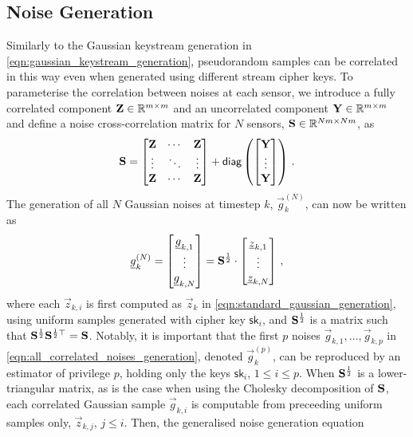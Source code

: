 \documentclass[conference]{IEEEtran}
\begin{document}
\subsection{Noise Generation}\label{subsec:noise_gen}
Similarly to the Gaussian keystream generation in \eqref{eqn:gaussian_keystream_generation}, pseudorandom samples can be correlated in this way even when generated using different stream cipher keys. To parameterise the correlation between noises at each sensor, we introduce a fully correlated component ${{\mathbf{Z}}}\in\mathbb{R}^{m\times m}$ and an uncorrelated component ${{\mathbf{Y}}}\in\mathbb{R}^{m\times m}$ and define a noise cross-correlation matrix for $N$ sensors, ${{\mathbf{S}}} \in \mathbb{R}^{Nm\times Nm}$, as
\begin{equation}\label{eqn:noise_correlation_matrix}
  \mat{S}=
  \begin{bmatrix}
    \mat{Z} & \cdots & \mat{Z}\\
    \vdots & \ddots & \vdots\\
    \mat{Z} & \cdots & \mat{Z}\\
  \end{bmatrix}+\mathsf{diag}\left(
  \begin{bmatrix}
    \mat{Y}\\
    \vdots\\
    \mat{Y}\\
  \end{bmatrix}\right)\,.
\end{equation}
The generation of all $N$ Gaussian noises at timestep $k$, $\vec{g}_k^{(N)}$, can now be written as
\begin{equation}\label{eqn:all_correlated_noises_generation}
  \vec{g}_k^{(N)}=
  \begin{bmatrix}
    \vec{g}_{k,1}\\
    \vdots\\
    \vec{g}_{k,N}
  \end{bmatrix}=
  \mat{S}^\frac{1}{2}\cdot
  \begin{bmatrix}
    \vec{z}_{k,1}\\
    \vdots\\
    \vec{z}_{k,N}
  \end{bmatrix}\,,
\end{equation}
where each $\vec{z}_{k,i}$ is first computed as $\vec{z}_k$ in \eqref{eqn:standard_gaussian_generation}, using uniform samples generated with cipher key $\mathsf{sk}_i$, and ${{\mathbf{S}}}^\frac{1}{2}$ is a matrix such that ${{\mathbf{S}}}^\frac{1}{2}{{\mathbf{S}}}^{\frac{1}{2}\top}={{\mathbf{S}}}$. Notably, it is important that the first $p$ noises $\vec{g}_{k,1},\dots,\vec{g}_{k,p}$ in \eqref{eqn:all_correlated_noises_generation}, denoted $\vec{g}_k^{(p)}$, can be reproduced by an estimator of privilege $p$, holding only the keys $\mathsf{sk}_i$, $1\leq i \leq p$. When ${{\mathbf{S}}}^\frac{1}{2}$ is a lower-triangular matrix, as is the case when using the Cholesky decomposition of ${{\mathbf{S}}}$, each correlated Gaussian sample $\vec{g}_{k,i}$ is computable from preceeding uniform samples only, $\vec{z}_{k,j}$, $j\leq i$. Then, the generalised noise generation equation
\end{document}
